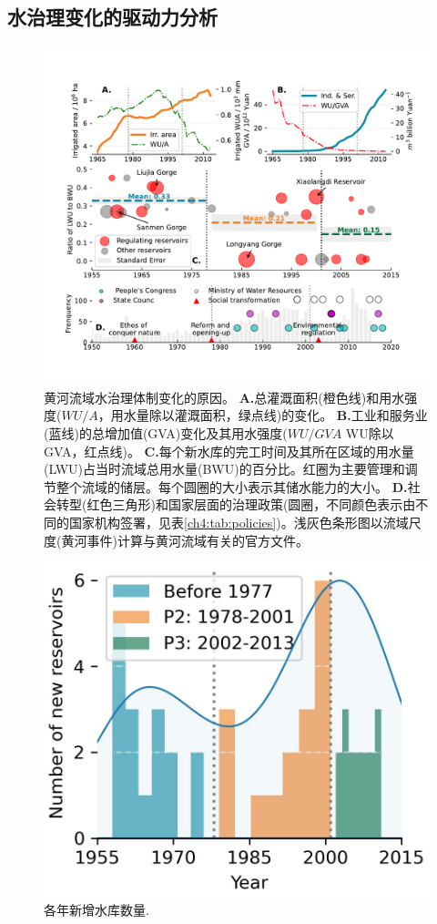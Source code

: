 
\subsection{水治理变化的驱动力分析}
\label{Res.2}

\begin{figure}[th!]
	\centering
	\includegraphics[width=0.9\linewidth]{img/ch4/causes.pdf}
	\caption{
		黄河流域水治理体制变化的原因。
		\textbf{A.}总灌溉面积(橙色线)和用水强度($WU/A$，用水量除以灌溉面积，绿点线)的变化。
        \textbf{B.}工业和服务业(蓝线)的总增加值(GVA)变化及其用水强度($WU/GVA$ WU除以GVA，红点线)。
        \textbf{C.}每个新水库的完工时间及其所在区域的用水量(LWU)占当时流域总用水量(BWU)的百分比。红圈为主要管理和调节整个流域的储层。每个圆圈的大小表示其储水能力的大小。
        \textbf{D.}社会转型(红色三角形)和国家层面的治理政策(圆圈，不同颜色表示由不同的国家机构签署，见表\ref{ch4:tab:policies})。浅灰色条形图以流域尺度(黄河事件)计算与黄河流域有关的官方文件。
	}
	\label{ch4:fig:mechanism}
\end{figure}


\begin{figure}[tb]
    \centering
    \includegraphics[width=0.6\linewidth]{img/ch4/reservoirs.jpg}
    \caption{
        各年新增水库数量.
    }
    \label{ch4:fig:reservoirs}
\end{figure}



